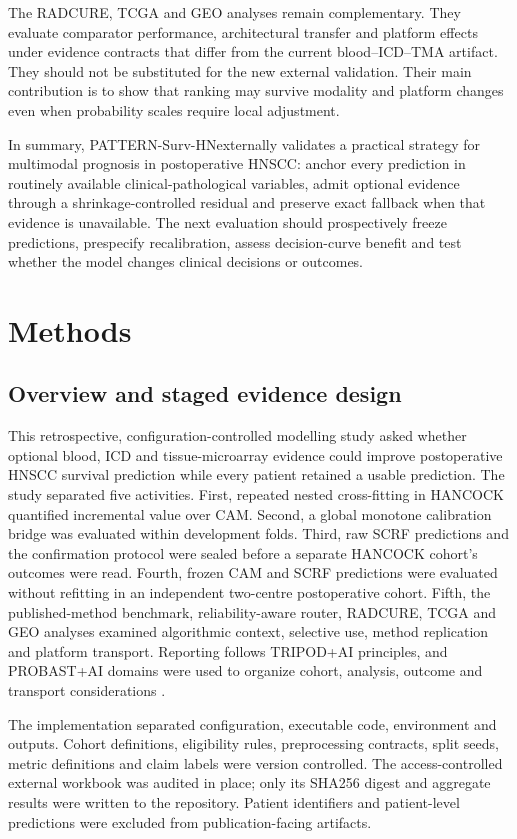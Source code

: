 \documentclass[pdflatex,sn-nature]{sn-jnl}
\newcommand{\methodname}{PATTERN-Surv-HN}
\begin{document}
The RADCURE, TCGA and GEO analyses remain complementary. They evaluate comparator performance, architectural transfer and platform effects under evidence contracts that differ from the current blood--ICD--TMA artifact. They should not be substituted for the new external validation. Their main contribution is to show that ranking may survive modality and platform changes even when probability scales require local adjustment.

In summary, \methodname externally validates a practical strategy for multimodal prognosis in postoperative HNSCC: anchor every prediction in routinely available clinical-pathological variables, admit optional evidence through a shrinkage-controlled residual and preserve exact fallback when that evidence is unavailable. The next evaluation should prospectively freeze predictions, prespecify recalibration, assess decision-curve benefit and test whether the model changes clinical decisions or outcomes.

\section{Methods}

\subsection{Overview and staged evidence design}
This retrospective, configuration-controlled modelling study asked whether optional blood, ICD and tissue-microarray evidence could improve postoperative HNSCC survival prediction while every patient retained a usable prediction. The study separated five activities. First, repeated nested cross-fitting in HANCOCK quantified incremental value over CAM. Second, a global monotone calibration bridge was evaluated within development folds. Third, raw SCRF predictions and the confirmation protocol were sealed before a separate HANCOCK cohort's outcomes were read. Fourth, frozen CAM and SCRF predictions were evaluated without refitting in an independent two-centre postoperative cohort. Fifth, the published-method benchmark, reliability-aware router, RADCURE, TCGA and GEO analyses examined algorithmic context, selective use, method replication and platform transport. Reporting follows TRIPOD+AI principles, and PROBAST+AI domains were used to organize cohort, analysis, outcome and transport considerations \cite{collins2024,moons2025}.

The implementation separated configuration, executable code, environment and outputs. Cohort definitions, eligibility rules, preprocessing contracts, split seeds, metric definitions and claim labels were version controlled. The access-controlled external workbook was audited in place; only its SHA256 digest and aggregate results were written to the repository. Patient identifiers and patient-level predictions were excluded from publication-facing artifacts.
\end{document}
